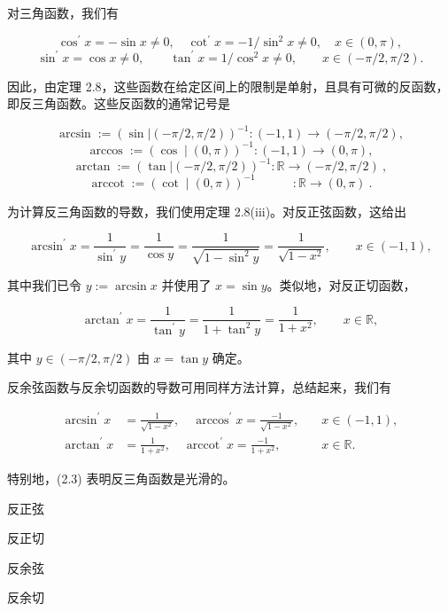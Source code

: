\begin{application}

对三角函数，我们有

\[
\cos^{\prime}x=-\sin x\neq0,\quad\cot^{\prime}x=-1/\sin^{2}x\neq0,\quad x\in(0,\pi),
\]
\[
\sin^{\prime}x=\cos x\neq0,\qquad\tan^{\prime}x=1/\cos^{2}x\neq0,\qquad x\in(-\pi/2,\pi/2).
\]

因此，由定理 2.8，这些函数在给定区间上的限制是单射，且具有可微的反函数，即反三角函数。这些反函数的通常记号是

\[
\arcsin:=\left(\sin\big|(-\pi/2,\pi/2)\right)^{-1}:(-1,1)\to(-\pi/2,\pi/2),
\]
\[
\arccos:=\left(\cos\mid(0,\pi)\right)^{-1}:(-1,1)\to(0,\pi),
\]
\[
\arctan:=\left(\tan\big|(-\pi/2,\pi/2)\right)^{-1}:\mathbb{R}\to(-\pi/2,\pi/2)~,
\]
\[
\operatorname{a r c c o t}:=\left(\cot\mid(0,\pi)\right)^{-1}\qquad\quad:\mathbb{R}\to(0,\pi)~.
\]

为计算反三角函数的导数，我们使用定理 2.8(iii)。对反正弦函数，这给出

\[
\arcsin^{\prime}x=\frac{1}{\sin^{\prime}y}=\frac{1}{\cos y}=\frac{1}{\sqrt{1-\sin^{2}y}}=\frac{1}{\sqrt{1-x^{2}}},\qquad x\in(-1,1),
\]

其中我们已令 $ y := \arcsin x $ 并使用了 $ x = \sin y $。类似地，对反正切函数，

\[
\arctan^{\prime}x=\frac{1}{\tan^{\prime}y}=\frac{1}{1+\tan^{2}y}=\frac{1}{1+x^{2}},\qquad x\in\mathbb{R},
\]

其中 $ y \in (-\pi/2, \pi/2) $ 由 $ x = \tan y $ 确定。

反余弦函数与反余切函数的导数可用同样方法计算，总结起来，我们有

\begin{equation}
\begin{aligned}
\arcsin^{\prime}x&=\frac{1}{\sqrt{1-x^{2}}},\quad\arccos^{\prime}x=\frac{-1}{\sqrt{1-x^{2}}},\quad&x\in(-1,1),\\\arctan^{\prime}x&=\frac{1}{1+x^{2}},\quad\operatorname{arccot}^{\prime}x=\frac{-1}{1+x^{2}},\quad&x\in\mathbb{R}.
\end{aligned}
\end{equation}

特别地，(2.3) 表明反三角函数是光滑的。


反正弦


反正切


反余弦


反余切

\end{application}

